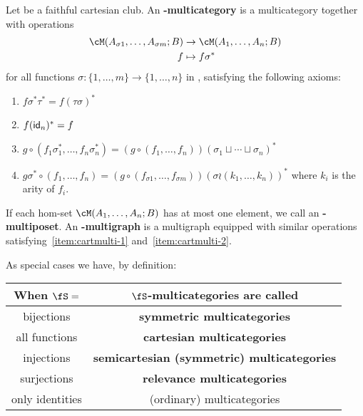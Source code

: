 \begin{defn}\label{defn:fS-multicategory}
  Let \fS be a faithful cartesian club.
  An \textbf{\fS-multicategory} is a multicategory \cM together with operations
  \begin{align*}
    \cM(A_{\sigma 1},\dots,A_{\sigma m}; B) &\to \cM(A_1,\dots,A_n;B)\\
    f &\mapsto f\sigma^*
  \end{align*}
  for all functions $\sigma : \{1,\dots,m\} \to \{1,\dots,n\}$ in \fS, satisfying the following axioms:
  \begin{enumerate}
  \item $f \sigma^* \tau^* = f(\tau\sigma)^*$\label{item:cartmulti-1}
  \item $f (\mathsf{id}_n)^* = f$\label{item:cartmulti-2}
  \item $g\circ (f_1 \sigma_1^* ,\dots, f_n \sigma_n^*) = (g \circ (f_1,\dots,f_n))(\sigma_1\sqcup \cdots \sqcup \sigma_n)^*$\label{item:cartmulti-3}
  \item $g\sigma^* \circ (f_1,\dots,f_n) = (g\circ (f_{\sigma 1},\dots, f_{\sigma m}))(\sigma \wr (k_1,\dots,k_n))^*$ where $k_i$ is the arity of $f_i$.\label{item:cartmulti-4}
  \end{enumerate}
  If each hom-set $\cM(A_1,\dots,A_n;B)$ has at most one element, we call \cM an \textbf{\fS-multiposet}.
  An \textbf{\fS-multigraph} is a multigraph equipped with similar operations satisfying~\ref{item:cartmulti-1} and~\ref{item:cartmulti-2}.
\end{defn}

As special cases we have, by definition:
\begin{center}
\begin{tabular}{c|c}
  When $\fS=$ & $\fS$-multicategories are called\\\hline
  bijections & \textbf{symmetric multicategories}\\
  all functions & \textbf{cartesian multicategories}\\
  injections & \textbf{semicartesian (symmetric) multicategories}\\
  surjections & \textbf{relevance multicategories}\\
  only identities & (ordinary) multicategories
\end{tabular}
\end{center}


